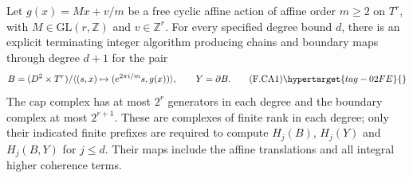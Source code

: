 



\begin{theorem}\hypertarget{tag-02NO}{}\label{maps:src:F.2.33}


Let $g(x)=Mx+v/m$ be a free cyclic affine action of affine order
$m\geq2$ on $T^r$, with $M\in\mathrm{GL}(r,\mathbb Z)$ and
$v\in\mathbb Z^r$.  For every specified degree bound $d$, there is
an explicit terminating integer algorithm producing chains and
boundary maps through degree $d+1$ for the pair
\[
 B=(D^2\times T^r)/\langle(s,x)\mapsto
 (e^{2\pi i/m}s,g(x))\rangle,
 \qquad Y=\partial B.                                      \tag{F.CA1}\hypertarget{tag-02FE}{}\label{maps:eq:F.CA1}
\]
The cap complex has at most $2^r$ generators in each degree and
the boundary complex at most $2^{r+1}$.  These are complexes of
finite rank in each degree; only their indicated finite prefixes
are required to compute $H_j(B)$, $H_j(Y)$ and $H_j(B,Y)$ for
$j\leq d$.  Their maps include the affine translations and all integral higher coherence terms.

\end{theorem}

